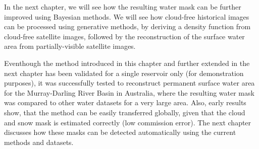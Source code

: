In the next chapter, we will see how the resulting water mask can be further improved using Bayesian methods. We will see how cloud-free historical images can be processed using generative methods, by deriving a density function from cloud-free satellite images, followed by the reconstruction of the surface water area from partially-visible satellite images.

Eventhough the method introduced in this chapter and further extended in the next chapter has been validated for a single reservoir only (for demonstration purposes), it was successfully tested to reconstruct permanent surface water area for the Murray-Darling River Basin in Australia, where the resulting water mask was compared to other water datasets for a very large area. Also, early results show, that the method can be easily transferred globally, given that the cloud and snow mask is estimated correctly (low commission error). The next chapter discusses how these masks can be detected automatically using the current methods and datasets.



